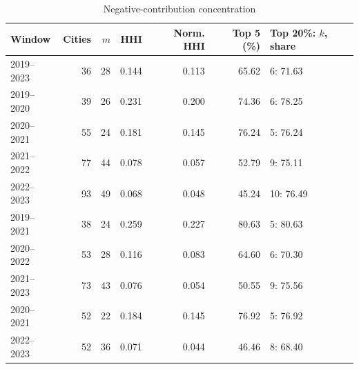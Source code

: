 \begin{table}[htbp]\centering\setlength{\tabcolsep}{4pt}\small
\caption{Negative-contribution concentration}\label{tab:si_concentration}
\begin{tabular}{@{}lrrrrrl@{}}\toprule
Window & Cities & $m$ & HHI & Norm. HHI & Top 5 (\%) & Top 20\%: $k$, share\\\midrule
2019--2023 & 36 & 28 & 0.144 & 0.113 & 65.62 & 6: 71.63\\
2019--2020 & 39 & 26 & 0.231 & 0.200 & 74.36 & 6: 78.25\\
2020--2021 & 55 & 24 & 0.181 & 0.145 & 76.24 & 5: 76.24\\
2021--2022 & 77 & 44 & 0.078 & 0.057 & 52.79 & 9: 75.11\\
2022--2023 & 93 & 49 & 0.068 & 0.048 & 45.24 & 10: 76.49\\
2019--2021 & 38 & 24 & 0.259 & 0.227 & 80.63 & 5: 80.63\\
2020--2022 & 53 & 28 & 0.116 & 0.083 & 64.60 & 6: 70.30\\
2021--2023 & 73 & 43 & 0.076 & 0.054 & 50.55 & 9: 75.56\\
2020--2021 & 52 & 22 & 0.184 & 0.145 & 76.92 & 5: 76.92\\
2022--2023 & 52 & 36 & 0.071 & 0.044 & 46.46 & 8: 68.40\\
\bottomrule\end{tabular}
\end{table}
